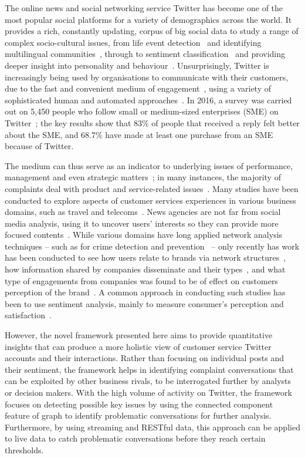 \documentclass[sigconf]{acmart}
\begin{document}
The online news and social networking service Twitter has become one
of the most popular social platforms for a variety of demographics
across the world. It provides a rich, constantly updating, corpus of
big social data to study a range of complex socio-cultural issues,
from life event detection~\cite{blamey-et-al-2013} and identifying
multilingual communities~\cite{albishry-et-al:iccci2017}, through to
sentiment classification~\cite{blamey-et-al-2012} and providing deeper
insight into personality and
behaviour~\cite{mostafa-et-al-ai2016}. Unsurprisingly, Twitter is
increasingly being used by organisations to communicate with their
customers, due to the fast and convenient medium of
engagement~\cite{ma-et-al:2015}, using a variety of sophisticated
human and automated
approaches~\cite{verhagen-et-al:2014,xu-et-al:2017}. In 2016, a survey
was carried out on 5,450 people who follow small or medium-sized
enterprises (SME) on Twitter~\cite{Twitter2016}; the key results show
that 83\% of people that received a reply felt better about the SME,
and 68.7\% have made at least one purchase from an SME because of
Twitter.

The medium can thus serve as an indicator to underlying issues of
performance, management and even strategic
matters~\cite{gregoire-et-al:2015}; in many instances, the majority of
complaints deal with product and service-related
issues~\cite{einwiller+steilen:2015}. Many studies have been conducted
to explore aspects of customer services experiences in various
business domains, such as travel and
telecoms~\cite{Shakeel2017,Zhang2016,Wattimena2017,misopoulos-et-al:2014,Khatoon2017}.
News agencies are not far from social media analysis, using it to
uncover users' interests so they can provide more focused
contents~\cite{Nigam2016}. While various domains have long applied
network analysis techniques -- such as for crime detection and
prevention~\cite{oatley+crick:2015,oatley-et-al:dasc2015} -- only
recently has work has been conducted to see how users relate to brands
via network structures~\cite{Cutler2017}, how information shared by
companies disseminate and their types~\cite{Piccialli2017}, and what
type of engagements from companies was found to be of effect on
customers perception of the brand~\cite{Ibrahim2017}. A common
approach in conducting such studies has been to use sentiment
analysis, mainly to measure consumer's perception and
satisfaction~\cite{Zhang2016,Al-Hussaini2017}.

However, the novel framework presented here aims to provide
quantitative insights that can produce a more holistic view of
customer service Twitter accounts and their interactions. Rather than
focusing on individual posts and their sentiment, the framework helps
in identifying complaint conversations that can be exploited by other
business rivals, to be interrogated further by analysts or decision
makers. With the high volume of activity on Twitter, the framework
focuses on detecting possible key issues by using the connected
component feature of graph to identify problematic conversations for
further analysis. Furthermore, by using streaming and RESTful data,
this approach can be applied to live data to catch problematic
conversations before they reach certain thresholds.
\end{document}
